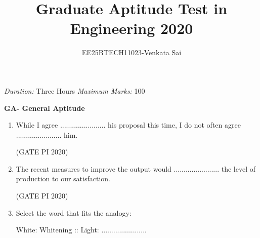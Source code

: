 \documentclass[journal,12pt,onecolumn]{IEEEtran}
\title{Graduate Aptitude Test in Engineering 2020}
\author{EE25BTECH11023-Venkata Sai}
\theoremstyle{remark}
\begin{document}
\noindent
\maketitle
\textit{Duration:} Three Hours \hfill \textit{Maximum Marks:} 100

\textbf{GA- General Aptitude}
\begin{enumerate}

\item While I agree ....................... his proposal this time, I do not often agree ....................... him.
\begin{enumerate}
\end{enumerate}

\hfill (GATE PI 2020)

\item The recent measures to improve the output would ....................... the level of production to our satisfaction.
\begin{enumerate}
\end{enumerate}

\hfill (GATE PI 2020)

\item Select the word that fits the analogy:

White: Whitening :: Light: .......................

\begin{enumerate}
\end{enumerate}


\end{enumerate}
\end{document}
